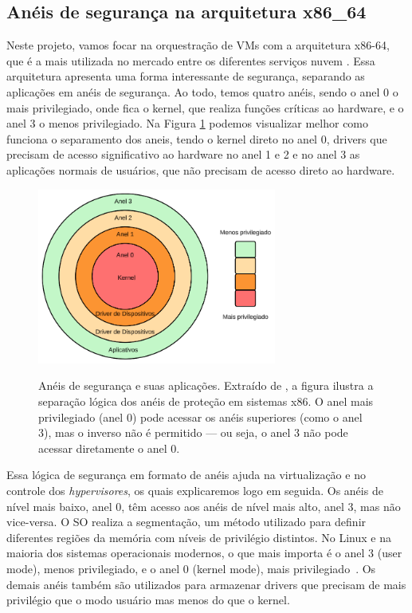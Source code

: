 \subsection{Anéis de segurança na arquitetura x86\_64}
Neste projeto, vamos focar na orquestração de VMs com a arquitetura x86-64, que é a mais utilizada no mercado entre os diferentes serviços nuvem \citep{DataCenterCPUMarketAMDSurpassesIntelinShareGrowth}. Essa arquitetura apresenta uma forma interessante de segurança, separando as aplicações em anéis de segurança. Ao todo, temos quatro anéis, sendo o anel 0 o mais privilegiado, onde fica o kernel, que realiza funções críticas ao hardware, e o anel 3 o menos privilegiado. Na Figura \ref{fig:rings_x86} podemos visualizar melhor como funciona o separamento dos aneis, tendo o kernel direto no anel 0, drivers que precisam de acesso significativo ao hardware no anel 1 e 2 e no anel 3 as aplicações normais de usuários, que não precisam de acesso direto ao hardware.


\begin{figure}[htbp]
  \centering
  \caption{Anéis de segurança e suas aplicações. Extraído de \citep{chirammal2016mastering}, a figura ilustra a separação lógica dos anéis de proteção em sistemas x86. O anel mais privilegiado (anel 0) pode acessar os anéis superiores (como o anel 3), mas o inverso não é permitido — ou seja, o anel 3 não pode acessar diretamente o anel 0.}
  \includegraphics[width=0.7\textwidth]{images/rings_x86.png}
  \label{fig:rings_x86}
\end{figure}

Essa lógica de segurança em formato de anéis ajuda na virtualização e no controle dos \textit{hypervisores}, os quais explicaremos logo em seguida. Os anéis de nível mais baixo, anel 0, têm acesso aos anéis de nível mais alto, anel 3, mas não vice-versa. O SO realiza a segmentação, um método utilizado para definir diferentes regiões da memória com níveis de privilégio distintos. No Linux e na maioria dos sistemas operacionais modernos, o que mais importa é o anel 3 (user mode), menos privilegiado, e o anel 0 (kernel mode), mais privilegiado~\citep{modernOS}. Os demais anéis também são utilizados para armazenar drivers que precisam de mais privilégio que o modo usuário mas menos do que o kernel.

